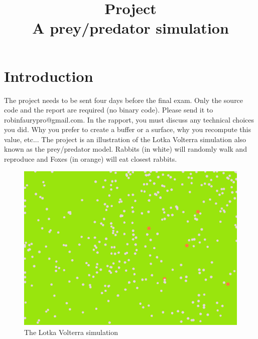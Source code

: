\documentclass{article}
\begin{document}
\title{Project\\A prey/predator simulation}
\maketitle

\section{Introduction}
The project needs to be sent four days before the final exam. Only the source code and the report are required (no binary code). Please send it to robinfaurypro@gmail.com. In the rapport, you must discuss any technical choices you did. Why you prefer to create a buffer or a surface, why you recompute this value, etc...
The project is an illustration of the Lotka Volterra simulation also known as the prey/predator model. Rabbits (in white) will randomly walk and reproduce and Foxes (in orange) will eat closest rabbits. 
\begin{figure}[H]
	\centering
	\includegraphics[scale=0.54]{figures/project.png}
	\caption{The Lotka Volterra simulation}
\end{figure}
\end{document}
